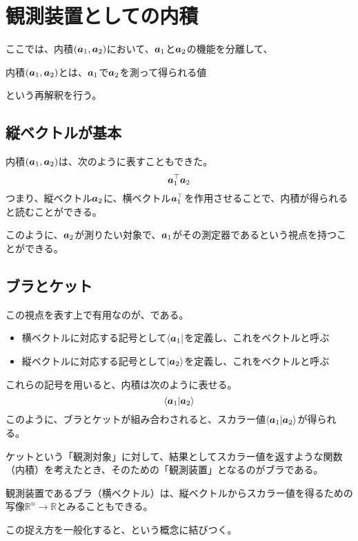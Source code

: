 \documentclass[../../../topic_linear-algebra]{subfiles}
\begin{document}
\sectionline
\section{観測装置としての内積}

ここでは、内積$(\vb*{a}_1, \vb*{a}_2)$において、$\vb*{a}_1$と$\vb*{a}_2$の機能を分離して、
\begin{emphabox}
  \begin{spacebox}
    \begin{center}
      内積$(\vb*{a}_1, \vb*{a}_2)$とは、$\vb*{a}_1$で$\vb*{a}_2$を測って得られる値
    \end{center}
  \end{spacebox}
\end{emphabox}
という再解釈を行う。

\subsection{縦ベクトルが基本}

内積$(\vb*{a}_1, \vb*{a}_2)$は、次のように表すこともできた。
\begin{equation*}
  \vb*{a}_1^\top \vb*{a}_2
\end{equation*}
つまり、縦ベクトル$\vb*{a}_2$に、横ベクトル$\vb*{a}_1^\top$を作用させることで、内積が得られると読むことができる。

\br

このように、$\vb*{a}_2$が測りたい対象で、$\vb*{a}_1$がその測定器であるという視点を持つことができる。

\subsection{ブラとケット}

この視点を表す上で有用なのが、である。

\begin{itemize}
  \item 横ベクトルに対応する記号として$\bra{\vb*{a}_1}$を定義し、これをベクトルと呼ぶ
  \item 縦ベクトルに対応する記号として$\ket{\vb*{a}_2}$を定義し、これをベクトルと呼ぶ
\end{itemize}

これらの記号を用いると、内積は次のように表せる。
\begin{equation*}
  \braket{\vb*{a}_1|\vb*{a}_2}
\end{equation*}
このように、ブラとケットが組み合わされると、スカラー値$\braket{\vb*{a}_1|\vb*{a}_2}$が得られる。

\br

ケットという「観測対象」に対して、結果としてスカラー値を返すような関数（内積）を考えたとき、そのための「観測装置」となるのがブラである。

\br

観測装置であるブラ（横ベクトル）は、縦ベクトルからスカラー値を得るための写像$\mathbb{R}^n \to \mathbb{R}$とみることもできる。

この捉え方を一般化すると、という概念に結びつく。
\end{document}
